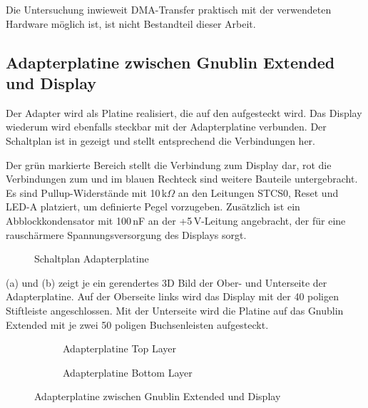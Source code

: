Die Untersuchung inwieweit DMA-Transfer praktisch mit der verwendeten Hardware möglich ist, ist nicht Bestandteil dieser Arbeit. 

\newpage
\subsection{Adapterplatine zwischen Gnublin Extended und Display}
Der Adapter wird als Platine realisiert, die auf den  aufgesteckt wird. Das Display wiederum wird ebenfalls steckbar mit der Adapterplatine verbunden. Der Schaltplan ist in  gezeigt und stellt entsprechend  die Verbindungen her.

Der grün markierte Bereich stellt die Verbindung zum Display dar, rot die Verbindungen zum  und im blauen Rechteck sind weitere Bauteile untergebracht. Es sind Pullup-Widerstände mit 10\,k$\Omega$ an den Leitungen STCS0, Reset und LED-A platziert, um definierte Pegel vorzugeben. Zusätzlich ist ein Abblockkondensator mit 100\,nF an der +5\,V-Leitung angebracht, der für eine rauschärmere Spannungsversorgung des Displays sorgt.

\begin{figure}[tbph]
	\centering
{}
	\caption{Schaltplan Adapterplatine}
	\label{fig:adapterplatine_sch}
\end{figure}
\newpage

 (a) und (b) zeigt je ein gerendertes 3D Bild der Ober- und Unterseite der Adapterplatine. Auf der Oberseite links wird das Display mit der 40 poligen Stiftleiste angeschlossen. Mit der Unterseite wird die Platine auf das Gnublin Extended mit je zwei 50 poligen Buchsenleisten aufgesteckt.

\begin{figure}
        \begin{center}
        \begin{subfigure}[htp]{0.8\textwidth}
                \caption{Adapterplatine Top Layer}
                \label{fig:adapter_top}
        \end{subfigure}

        \begin{subfigure}[htp]{0.8\textwidth}
                             				\caption{Adapterplatine Bottom Layer}
                \label{fig:adapter_bot}
        \end{subfigure}
		\end{center}
        \caption{Adapterplatine zwischen Gnublin Extended und Display}\label{fig:adapterplatine}
\end{figure}

